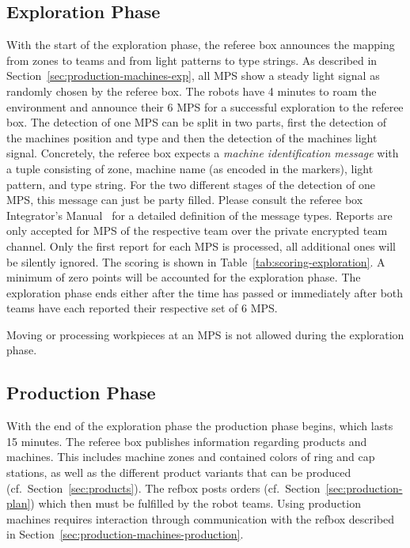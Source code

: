 \documentclass[12pt,twoside]{article}
\newcommand{\refsec}[1]{Section~\ref{#1}}
\newcommand{\reftab}[1]{Table~\ref{#1}}
\begin{document}
\subsection{Exploration Phase}
\label{sec:exploration-phase}
With the start of the exploration phase, the referee box announces the
mapping from zones to teams and from light patterns to type
strings. As described in \refsec{sec:production-machines-exp}, all MPS
show a steady light signal as randomly chosen by the referee box. The
robots have 4 minutes to roam the environment and announce their 6 MPS
for a successful exploration to the referee box. The detection of one
MPS can be split in two parts, first the detection of the machines
position and type and then the detection of the machines light signal.
Concretely, the referee box expects a \emph{machine identification
  message} with a tuple consisting of zone, machine name (as encoded
in the markers), light pattern, and type string.  For the two
different stages of the detection of one MPS, this message can just be
party filled.  Please consult the referee box Integrator's
Manual~\cite{RefBoxIntManual} for a detailed definition of the message
types. Reports are only accepted for MPS of the respective team over
the private encrypted team channel. Only the first report for each MPS
is processed, all additional ones will be silently ignored. The
scoring is shown in \reftab{tab:scoring-exploration}. A minimum of
zero points will be accounted for the exploration phase. The
exploration phase ends either after the time has passed or immediately
after both teams have each reported their respective set of 6 MPS.

Moving or processing workpieces at an MPS is not allowed during the
exploration phase.

\subsection{Production Phase}
\label{sec:production-phase}
With the end of the exploration phase the production phase begins,
which lasts \num{15} minutes. The referee box publishes information
regarding products and machines. This includes machine zones and
contained colors of ring and cap stations, as well as the different
product variants that can be produced (cf.~\refsec{sec:products}). The
refbox posts orders (cf.~\refsec{sec:production-plan}) which then must
be fulfilled by the robot teams. Using production machines requires
interaction through communication with the refbox described in
\refsec{sec:production-machines-production}.
\end{document}
